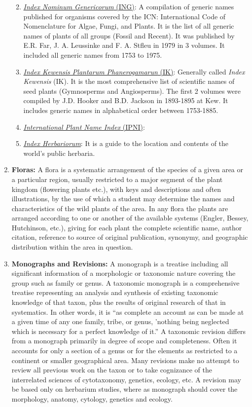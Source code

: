 \documentclass[
]{book}
\providecommand{\tightlist}{%
  \setlength{\itemsep}{0pt}\setlength{\parskip}{0pt}}
\begin{document}
\begin{enumerate}
  \begin{enumerate}
  \def\labelenumii{\roman{enumii})}
  \tightlist
  \item
    \href{https://naturalhistory2.si.edu/botany/ing/}{\emph{Index Nominum Genericorum} (ING)}: A compilation of generic names published for organisms covered by the ICN: International Code of Nomenclature for Algae, Fungi, and Plants. It is the list of all generic names of plants of all groups (Fossil and Recent). It was published by E.R. Far, J. A. Leussinke and F. A. Stfleu in 1979 in 3 volumes. It included all generic names from 1753 to 1975.
  \item
    \href{https://www.biodiversitylibrary.org/openurlmultiple.aspx?id=p42382218\%7Cp42403161\%7Cp42462730\%7Cp42402499}{\emph{Index Kewensis Plantarum Phanerogamarun} (IK)}: Generally called \emph{Index Kewensis} (IK). It is the most comprehensive list of scientific names of seed plants (Gymnosperms and Angiosperms). The first 2 volumes were compiled by J.D. Hooker and B.D. Jackson in 1893-1895 at Kew. It includes generic names in alphabetical order between 1753-1885.
  \item
    \href{https://www.ipni.org/}{\emph{International Plant Name Index} (IPNI)}:
  \item
    \href{http://sweetgum.nybg.org/science/ih/}{\emph{Index Herbariorum}}: It is a guide to the location and contents of the world's public herbaria.
  \end{enumerate}
\item
  \textbf{Floras:} A flora is a systematic arrangement of the species of a given area or a particular region, usually restricted to a major segment of the plant kingdom (flowering plants etc.), with keys and descriptions and often illustrations, by the use of which a student may determine the names and characteristics of the wild plants of the area. In any flora the plants are arranged according to one or another of the available systems (Engler, Bessey, Hutchinson, etc.), giving for each plant the complete scientific name, author citation, reference to source of original publication, synonymy, and geographic distribution within the area in question.
\item
  \textbf{Monographs and Revisions:} A monograph is a treatise including all significant information of a morphologic or taxonomic nature covering the group such as family or genus. A taxonomic monograph is a comprehensive treatise representing an analysis and synthesis of existing taxonomic knowledge of that taxon, plus the results of original research of that in systematics. In other words, it is ``as complete an account as can be made at a given time of any one family, tribe, or genus, 'nothing being neglected which is necessary for a perfect knowledge of it.'' A taxonomic revision differs from a monograph primarily in degree of scope and completeness. Often it accounts for only a section of a genus or for the elements as restricted to a continent or smaller geographical area. Many revisions make no attempt to review all previous work on the taxon or to take cognizance of the interrelated sciences of cytotaxonomy, genetics, ecology, etc. A revision may be based only on herbarium studies, where as monograph should cover the morphology, anatomy, cytology, genetics and ecology.

\end{enumerate}
\end{document}

